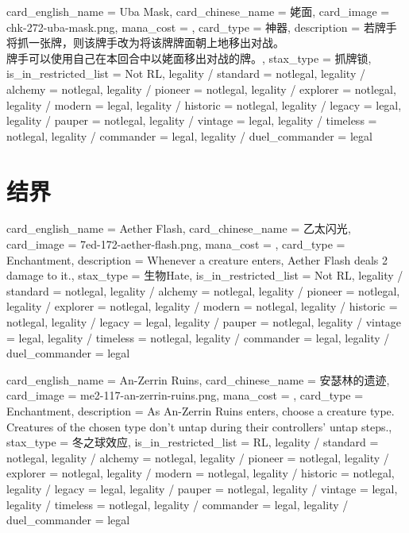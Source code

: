 \documentclass[lang = cn, color = black, 10pt]{AllThatStax}
\begin{document}
\card
{
	card_english_name = {Uba Mask},
	card_chinese_name = {姥面},
	card_image = chk-272-uba-mask.png,
	mana_cost = ,
	card_type = 神器,
	description = {若牌手将抓一张牌，则该牌手改为将该牌牌面朝上地移出对战。\\
		牌手可以使用自己在本回合中以姥面移出对战的牌。},
	stax_type = 抓牌锁,
	is_in_restricted_list = Not RL,
	legality / standard = notlegal,
	legality / alchemy = notlegal,
	legality / pioneer = notlegal,
	legality / explorer = notlegal,
	legality / modern = legal,
	legality / historic = notlegal,
	legality / legacy = legal,
	legality / pauper = notlegal,
	legality / vintage = legal,
	legality / timeless = notlegal,
	legality / commander = legal,
	legality / duel_commander = legal
}

\section{结界}

\card
{
	card_english_name = {Aether Flash},
	card_chinese_name = {乙太闪光},
	card_image = 7ed-172-aether-flash.png,
	mana_cost = ,
	card_type = Enchantment,
	description = {Whenever a creature enters, Aether Flash deals 2 damage to it.},
	stax_type = 生物Hate,
	is_in_restricted_list = Not RL,
	legality / standard = notlegal,
	legality / alchemy = notlegal,
	legality / pioneer = notlegal,
	legality / explorer = notlegal,
	legality / modern = notlegal,
	legality / historic = notlegal,
	legality / legacy = legal,
	legality / pauper = notlegal,
	legality / vintage = legal,
	legality / timeless = notlegal,
	legality / commander = legal,
	legality / duel_commander = legal
}

\card
{
	card_english_name = {An-Zerrin Ruins},
	card_chinese_name = {安瑟林的遗迹},
	card_image = me2-117-an-zerrin-ruins.png,
	mana_cost = ,
	card_type = Enchantment,
	description = {As An-Zerrin Ruins enters, choose a creature type.\\
		Creatures of the chosen type don't untap during their controllers' untap steps.},
	stax_type = 冬之球效应,
	is_in_restricted_list = RL,
	legality / standard = notlegal,
	legality / alchemy = notlegal,
	legality / pioneer = notlegal,
	legality / explorer = notlegal,
	legality / modern = notlegal,
	legality / historic = notlegal,
	legality / legacy = legal,
	legality / pauper = notlegal,
	legality / vintage = legal,
	legality / timeless = notlegal,
	legality / commander = legal,
	legality / duel_commander = legal
}
\end{document}
